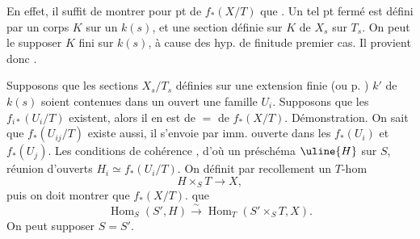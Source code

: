 En effet,  il suffit de montrer pour  pt  de $f_*(X/T)$ que .
Un tel pt fermé est défini par un corps $K$ sur un $k(s)$, et une section définie sur $K$ de $X_s$ sur $T_s$. On peut le supposer  $K$ fini sur $k(s)$, à cause des hyp. de finitude   premier cas. Il provient donc \unsure{---}.

  Supposons que les sections $X_s/T_s$ définies sur une extension finie (ou p. ) $k'$ de $k(s)$ soient contenues dans un ouvert   une famille $U_i$.
Supposons que les $f_{i*}(U_i/T)$ existent, alors il en est de $=$ de $f_*(X/T)$.
Démonstration. On  sait que $f_*(U_{ij}/T)$ existe aussi, il s'envoie par imm. ouverte dans les $f_*(U_i)$ et $f_*(U_j)$. Les conditions de cohérence , d'où un préschéma $\uline{H}$ sur $S$,  réunion d'ouverts $H_i\simeq f_*(U_i/T)$.
On définit par recollement un $T$-hom
\[
H\times_S T\longrightarrow X,
\]
puis on doit montrer que  $f_*(X/T)$.
  que
\[
\operatorname{Hom}_S(S',H)\xrightarrow{\sim}\operatorname{Hom}_T(S'\times_S T,X).
\]
On peut supposer $S=S'$.
